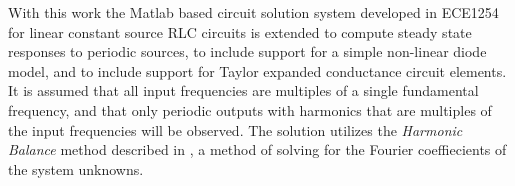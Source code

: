 With this work the Matlab based circuit solution system developed in ECE1254 for linear constant source RLC circuits is extended to compute steady state responses to periodic sources, to include support for a simple non-linear diode model, and to include support for Taylor expanded conductance circuit elements.
It is assumed that all input frequencies are multiples of a single fundamental frequency, and that only periodic outputs with harmonics that are multiples of the input frequencies will be observed.
The solution utilizes the \emph{Harmonic Balance} method described in \citep{giannini2004NonlinearMicrowaveCircuitDesign}, a method of solving for the Fourier coeffiecients of the system unknowns.